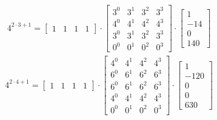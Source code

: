 \begin{align*}
    4^{2 \cdot 3 + 1} =
    \begin{bmatrix}
        1 & 1 & 1 & 1
    \end{bmatrix}
    \cdot
    \begin{bmatrix}
        3^0 & 3^1 & 3^2 & 3^3 \\
        4^0 & 4^1 & 4^2 & 4^3 \\
        3^0 & 3^1 & 3^2 & 3^3 \\
        0^0 & 0^1 & 0^2 & 0^3
    \end{bmatrix}
    \cdot
    \begin{bmatrix}
        1   \\
        -14 \\
        0   \\
        140
    \end{bmatrix}
\end{align*}
\begin{align*}
    4^{2 \cdot 4 + 1} =
    \begin{bmatrix}
        1 & 1 & 1 & 1
    \end{bmatrix}
    \cdot
    \begin{bmatrix}
        4^0 & 4^1 & 4^2 & 4^3 \\
        6^0 & 6^1 & 6^2 & 6^3 \\
        6^0 & 6^1 & 6^2 & 6^3 \\
        4^0 & 4^1 & 4^2 & 4^3 \\
        0^0 & 0^1 & 0^2 & 0^3
    \end{bmatrix}
    \cdot
    \begin{bmatrix}
        1    \\
        -120 \\
        0    \\
        0    \\
        630
    \end{bmatrix}
\end{align*}

